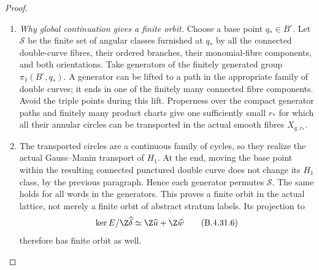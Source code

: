 \begin{proof}
\begin{enumerate}[label=\arabic*.,leftmargin=*]
\item \emph{Why global continuation gives a finite orbit.}
Choose a base point $q_*\in B^\circ$. Let $\mathscr S$ be the
finite set of angular classes furnished at $q_*$ by all the
connected double-curve fibres, their ordered branches, their
monomial-fibre components, and both orientations.
Take generators of the finitely generated group
$\pi_1(B^\circ,q_*)$. A generator can be lifted to a path in
the appropriate family of double curves; it ends in one of
the finitely many connected fibre components. Avoid the
triple points during this lift. Properness over the compact
generator paths and finitely many product charts give one
sufficiently small $r_*$ for which all their annular circles
can be transported in the actual smooth fibres
$X_{q,r_*}$.

\item The transported circles are a continuous family of cycles,
so they realize the actual Gauss--Manin transport of $H_1$.
At the end, moving the base point within the resulting
connected punctured double curve does not change its $H_1$
class, by the previous paragraph. Hence each generator
permutes $\mathscr S$. The same holds for all words in the
generators. This proves a finite orbit in the actual lattice,
not merely a finite orbit of abstract stratum labels.
Its projection to
\[
 \ker E/\Z\widehat\delta
       \simeq \Z\widehat u+\Z\widehat w
 \tag{B.4.31.6}
\]
therefore has finite orbit as well.


\end{enumerate}
\end{proof}
